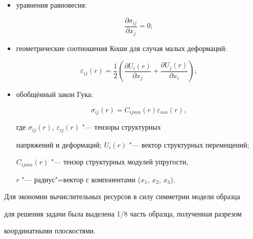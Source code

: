 \begin{itemize}

\item уравнения равновесия:

\begin{equation}

\label{osheva:eq1}

\frac{\partial \sigma _{ij} }{\partial x_j }=0;

\end{equation}



\item геометрические соотношения Коши для случая малых деформаций:

\begin{equation}

\label{osheva:eq2}

\varepsilon _{ij} (r)=\frac{1}{2}\left( \frac{\partial U_i (r)}{\partial x_j}+\frac{\partial U_j

(r)}{\partial x_i}\right);

\end{equation}



\item обобщённый закон Гука:

\begin{equation}

\label{osheva:eq3}

\sigma _{ij} (r)=C_{ijmn}(r) \varepsilon_{mn}(r),

\end{equation}

где $\sigma _{ij} (r)$, $\varepsilon _{ij} (r)$ "--- тензоры структурных

напряжений и деформаций; $U_i (r)$ "--- вектор структурных перемещений;

$C_{ijmn} (r)$ "--- тензор структурных модулей упругости,

$r$ "--- радиус"=вектор с компонентами ($x_1$, $x_2$, $x_3$).

\end{itemize}





Для экономии вычислительных ресурсов в силу симметрии модели образца

для решения задачи была выделена 1/8 часть образца, полученная разрезом

координатными плоскостями.



